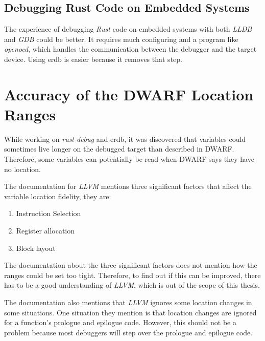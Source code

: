 \subsection{Debugging Rust Code on Embedded Systems}
The experience of debugging \emph{Rust} code on embedded systems with both \emph{LLDB} and \emph{GDB} could be better.
It requires much configuring and a program like \emph{openocd}, which handles the communication between the debugger and the target device.
Using \gls{erdb} is easier because it removes that step.



\section{Accuracy of the DWARF Location Ranges}\label{section:loc-ranges}
While working on \emph{rust-debug} and \gls{erdb}, it was discovered that variables could sometimes live longer on the debugged target than described in \gls{DWARF}.
Therefore, some variables can potentially be read when \gls{DWARF} says they have no location.


The documentation for \emph{LLVM} \cite{llvm-dbs} mentions three significant factors that affect the variable location fidelity, they are:

\begin{enumerate}
  \item Instruction Selection
  \item Register allocation
  \item Block layout
\end{enumerate}

The documentation about the three significant factors does not mention how the ranges could be set too tight.
Therefore, to find out if this can be improved, there has to be a good understanding of \emph{LLVM}, which is out of the scope of this thesis.


The documentation also mentions that \emph{LLVM} ignores some location changes in some situations.
One situation they mention is that location changes are ignored for a function's prologue and epilogue code.
However, this should not be a problem because most debuggers will step over the prologue and epilogue code.

